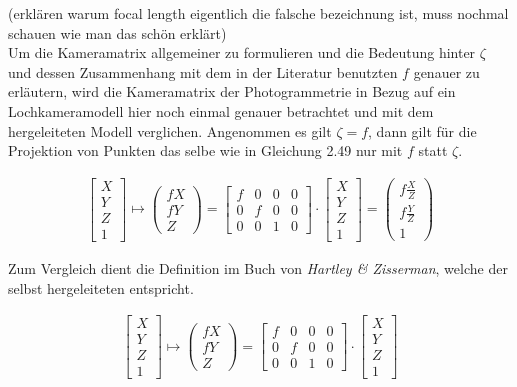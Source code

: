 (erklären warum focal length eigentlich die falsche bezeichnung ist, muss nochmal schauen wie man das schön erklärt)\\

Um die Kameramatrix allgemeiner zu formulieren und die Bedeutung hinter $\zeta$ und dessen Zusammenhang mit dem in der Literatur benutzten $f$ genauer zu erläutern, wird die Kameramatrix der Photogrammetrie in Bezug auf ein Lochkameramodell hier noch einmal genauer betrachtet und mit dem hergeleiteten Modell verglichen\cite{HZ,Heipke}. Angenommen es gilt $\zeta = f$, dann gilt für die Projektion von Punkten das selbe wie in Gleichung 2.49 nur mit $f$ statt $\zeta$. 

\begin{gather}
\begin{bmatrix}
X\\Y\\Z\\1
\end{bmatrix} \mapsto
\begin{pmatrix}
f X\\ f Y\\ Z
\end{pmatrix}
=
\begin{bmatrix}
f&0&0&0\\
0&f&0&0\\
0&0&1&0
\end{bmatrix}
\cdot
\begin{bmatrix}
X\\Y\\Z\\1
\end{bmatrix}
=
\begin{pmatrix}
f \frac{X}{Z}\\ f \frac{Y}{Z}\\1
\end{pmatrix}
\end{gather}

Zum Vergleich dient die Definition im Buch von \textit{Hartley \& Zisserman}\cite{HZ}, welche der selbst hergeleiteten entspricht.


\begin{gather}
\begin{bmatrix}
X\\Y\\Z\\1
\end{bmatrix} \mapsto
\begin{pmatrix}
f X\\ f Y\\ Z
\end{pmatrix}
=
\begin{bmatrix}
f&0&0&0\\
0&f&0&0\\
0&0&1&0
\end{bmatrix}
\cdot
\begin{bmatrix}
X\\Y\\Z\\1
\end{bmatrix}
\end{gather}		


